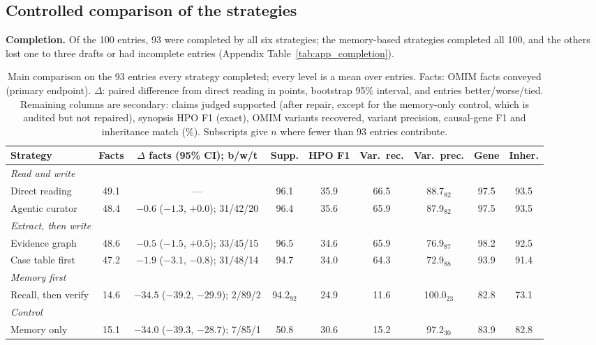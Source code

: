 \documentclass{article} %
\begin{document}
\subsection{Controlled comparison of the strategies}
\label{sec:main}
\textbf{Completion.} Of the 100 entries, 93 were completed by all six strategies; the memory-based strategies completed all 100, and the others lost one to three drafts or had incomplete entries (Appendix Table~\ref{tab:app_completion}).

\begin{table}[t]
\caption{Main comparison on the 93 entries every strategy completed; every level is a mean over entries. Facts: OMIM facts conveyed (primary endpoint). $\Delta$: paired difference from direct reading in points, bootstrap 95\% interval, and entries better/worse/tied. Remaining columns are secondary: claims judged supported (after repair, except for the memory-only control, which is audited but not repaired), synopsis HPO F1 (exact), OMIM variants recovered, variant precision, causal-gene F1 and inheritance match (\%). Subscripts give $n$ where fewer than 93 entries contribute.}
\label{tab:main}
\begin{center}
\footnotesize
\setlength{\tabcolsep}{2.2pt}
\begin{tabular}{lcccccccc}
\toprule
Strategy & Facts & $\Delta$ facts (95\% CI); b/w/t & Supp. & HPO F1 & Var.\ rec. & Var.\ prec. & Gene & Inher. \\
\midrule
\multicolumn{9}{l}{\emph{Read and write}} \\
Direct reading & 49.1 & --- & 96.1 & 35.9 & 66.5 & 88.7$_{82}$ & 97.5 & 93.5 \\
Agentic curator & 48.4 & $-0.6$ ($-1.3$, $+0.0$); 31/42/20 & 96.4 & 35.6 & 65.9 & 87.9$_{82}$ & 97.5 & 93.5 \\
\multicolumn{9}{l}{\emph{Extract, then write}} \\
Evidence graph & 48.6 & $-0.5$ ($-1.5$, $+0.5$); 33/45/15 & 96.5 & 34.6 & 65.9 & 76.9$_{87}$ & 98.2 & 92.5 \\
Case table first & 47.2 & $-1.9$ ($-3.1$, $-0.8$); 31/48/14 & 94.7 & 34.0 & 64.3 & 72.9$_{88}$ & 93.9 & 91.4 \\
\multicolumn{9}{l}{\emph{Memory first}} \\
Recall, then verify & 14.6 & $-34.5$ ($-39.2$, $-29.9$); 2/89/2 & 94.2$_{92}$ & 24.9 & 11.6 & 100.0$_{23}$ & 82.8 & 73.1 \\
\multicolumn{9}{l}{\emph{Control}} \\
Memory only & 15.1 & $-34.0$ ($-39.3$, $-28.7$); 7/85/1 & 50.8 & 30.6 & 15.2 & 97.2$_{30}$ & 83.9 & 82.8 \\
\bottomrule
\end{tabular}
\end{center}
\end{table}
\end{document}
